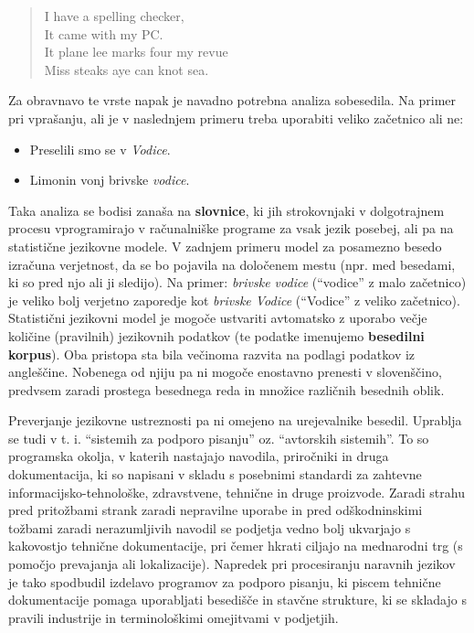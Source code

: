 \begin{multicols}{2}
\begin{quote}
  I have a spelling checker,\\
  It came with my PC.\\
  It plane lee marks four my revue\\
  Miss steaks aye can knot sea.
\end{quote}

Za obravnavo te vrste napak je navadno potrebna analiza sobesedila. Na primer pri vprašanju, ali je v naslednjem primeru treba uporabiti veliko začetnico ali ne:

\begin{itemize}
\item Preselili smo se v \textit{Vodice}.
\item Limonin vonj brivske \textit{vodice}.
\end{itemize}

Taka analiza se bodisi zanaša na \textbf{slovnice}, ki jih strokovnjaki v dolgotrajnem procesu vprogramirajo v računalniške programe za vsak jezik posebej, ali pa na statistične jezikovne modele. V zadnjem primeru model za posamezno besedo izračuna verjetnost, da se bo pojavila na določenem mestu (npr. med besedami, ki so pred njo ali ji sledijo). Na primer: \textit{brivske vodice} (“vodice” z malo začetnico) je veliko bolj verjetno zaporedje kot \textit{brivske Vodice} (“Vodice” z veliko začetnico). Statistični jezikovni model je mogoče ustvariti avtomatsko z uporabo večje količine (pravilnih) jezikovnih podatkov (te podatke imenujemo \textbf{besedilni korpus}). Oba pristopa sta bila  večinoma razvita na podlagi podatkov iz angleščine. Nobenega od njiju pa ni mogoče enostavno prenesti v slovenščino, predvsem zaradi prostega besednega reda in množice različnih besednih oblik.

Preverjanje jezikovne ustreznosti pa ni omejeno na urejevalnike besedil. Uprablja se tudi v t. i. “sistemih za podporo pisanju” oz. “avtorskih sistemih”. To so programska okolja, v katerih nastajajo navodila, priročniki in druga dokumentacija, ki so napisani v skladu s posebnimi standardi za zahtevne informacijsko-tehnološke, zdravstvene, tehnične in druge proizvode. Zaradi strahu pred pritožbami strank zaradi nepravilne uporabe in pred odškodninskimi tožbami zaradi nerazumljivih navodil se podjetja vedno bolj ukvarjajo s kakovostjo tehnične dokumentacije, pri čemer hkrati ciljajo na mednarodni trg (s pomočjo prevajanja ali lokalizacije). Napredek pri procesiranju naravnih jezikov je tako spodbudil izdelavo programov za podporo pisanju, ki piscem tehnične dokumentacije pomaga uporabljati besedišče in stavčne strukture, ki se skladajo s pravili industrije in terminološkimi omejitvami v podjetjih.


\end{multicols}
